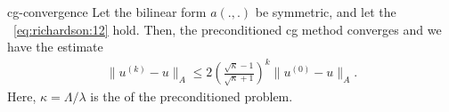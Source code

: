 \begin{Theorem}{cg-convergence}
  Let the bilinear form $a(.,.)$ be symmetric, and let the
  ~\eqref{eq:richardson:12} hold. Then,
  the preconditioned cg method converges and we have the estimate
  \begin{gather}
    \label{eq:cg:1}
    \|u^{(k)} - u\|_A \le 2
    \left(\frac{\sqrt\kappa-1}{\sqrt\kappa+1}\right)^k \|u^{(0)} - u\|_A.
  \end{gather}
  Here, $\kappa = \Lambda/\lambda$ is the  of the preconditioned problem.
\end{Theorem}

